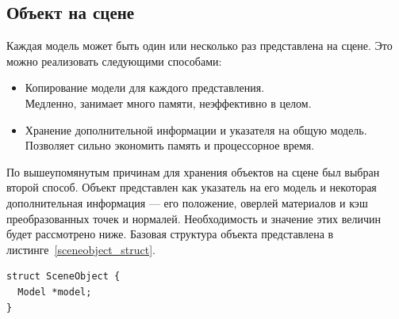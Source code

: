 \documentclass[a4paper,12pt]{report}
\numberwithin{equation}{section}
\begin{document}
\subsection{Объект на сцене}
Каждая модель может быть один или несколько раз представлена на сцене. Это можно реализовать следующими способами:
\begin{itemize}
\item Копирование модели для каждого представления. \\
Медленно, занимает много памяти, неэффективно в целом.
\item Хранение дополнительной информации и указателя на общую модель. \\
Позволяет сильно экономить память и процессорное время.
\end{itemize}
По вышеупомянутым причинам для хранения объектов на сцене был выбран второй способ. Объект представлен как указатель на его модель и некоторая дополнительная информация --- его положение, оверлей материалов и кэш преобразованных точек и нормалей. Необходимость и значение этих величин будет рассмотрено ниже. Базовая структура объекта представлена в листинге~\ref{sceneobject_struct}.

\begin{lstlisting}[float=p,caption={Структура данных ``Объект на сцене''},label=sceneobject_struct]
struct SceneObject {
  Model *model;
}
\end{lstlisting}
\end{document}
